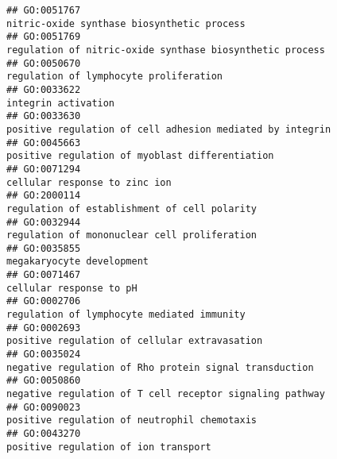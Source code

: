 \documentclass[
]{article}
\begin{document}
\begin{verbatim}
## GO:0051767                                                                                                       nitric-oxide synthase biosynthetic process
## GO:0051769                                                                                         regulation of nitric-oxide synthase biosynthetic process
## GO:0050670                                                                                                           regulation of lymphocyte proliferation
## GO:0033622                                                                                                                              integrin activation
## GO:0033630                                                                                        positive regulation of cell adhesion mediated by integrin
## GO:0045663                                                                                                  positive regulation of myoblast differentiation
## GO:0071294                                                                                                                    cellular response to zinc ion
## GO:2000114                                                                                                     regulation of establishment of cell polarity
## GO:0032944                                                                                                     regulation of mononuclear cell proliferation
## GO:0035855                                                                                                                        megakaryocyte development
## GO:0071467                                                                                                                          cellular response to pH
## GO:0002706                                                                                                       regulation of lymphocyte mediated immunity
## GO:0002693                                                                                                    positive regulation of cellular extravasation
## GO:0035024                                                                                           negative regulation of Rho protein signal transduction
## GO:0050860                                                                                         negative regulation of T cell receptor signaling pathway
## GO:0090023                                                                                                     positive regulation of neutrophil chemotaxis
## GO:0043270                                                                                                             positive regulation of ion transport

\end{verbatim}
\end{document}

